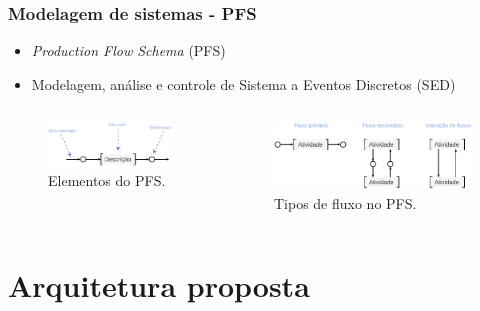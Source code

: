 \documentclass[10pt]{beamer}
\begin{document}
\begin{frame}
	\frametitle{Modelagem de sistemas - PFS} 
	
	\begin{itemize}
		\item \textit{Production Flow Schema} (PFS)
		\item Modelagem, análise e controle de Sistema a Eventos Discretos (SED)
	\end{itemize}

	\begin{columns}[c] %
		\begin{figure}[htb]
			\centering
			\caption{Elementos do PFS.}
			\label{fig:pfs-elementos}
			\includegraphics[width=1\textwidth]{pfs-elementos}
		\end{figure}
		
		\begin{figure}[htb]
			\centering
			\caption{Tipos de fluxo no PFS.}
			\label{fig:pfs-fluxos}
			\includegraphics[width=1\textwidth]{pfs-fluxos}
		\end{figure}
		
	\end{columns}
	
\end{frame}
\fi

\section{Arquitetura proposta}
\end{document}
